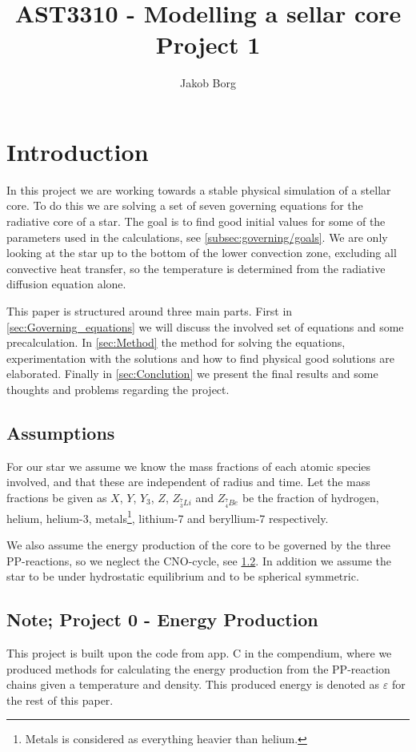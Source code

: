 \documentclass[11pt,a4paper,twocolumn,titlepage]{article}
\title{AST3310 - Modelling a sellar core\\ 
        \vspace{15mm}Project 1}
\author{Jakob Borg}
\begin{document}

\maketitle


\section{Introduction} \label{sec:Introduction}
In this project we are working towards a stable physical simulation of a stellar core. To do this we are solving a set of seven governing equations for the radiative core of a star. The goal is to find good initial values for some of the parameters used in the calculations, see \cref{subsec:governing/goals}. We are only looking at the star up to the bottom of the lower convection zone, excluding all convective heat transfer, so the temperature is determined from the radiative diffusion equation alone.

This paper is structured around three main parts. First in \cref{sec:Governing_equations} we will discuss the involved set of equations and some precalculation. In \cref{sec:Method} the method for solving the equations, experimentation with the solutions and how to find physical good solutions are elaborated. Finally in \cref{sec:Conclution} we present the final results and some thoughts and problems regarding the project.

\subsection{Assumptions}\label{subsec:Intro/Assumptions}
For our star we assume we know the mass fractions of each atomic species involved, and that these are independent of radius and time. Let the mass fractions be given as $X$, $Y$, $Y_3$, $Z$, $Z_{^7_3Li}$ and $Z_{^7_4Be}$ be the fraction of hydrogen, helium, helium-3, metals\footnote{Metals is considered as everything heavier than helium.}, lithium-7 and beryllium-7 respectively.

We also assume the energy production of the core to be governed by the three PP-reactions, so we neglect the CNO-cycle, see \cref{subsec:Intro/project0}. In addition we assume the star to be under hydrostatic equilibrium and to be spherical symmetric.

\subsection{Note; Project 0 - Energy Production} \label{subsec:Intro/project0}
This project is built upon the code from app. C in the compendium, where we produced methods for calculating the energy production from the PP-reaction chains given a temperature and density. This produced energy is denoted as $\varepsilon$ for the rest of this paper.
\end{document}
